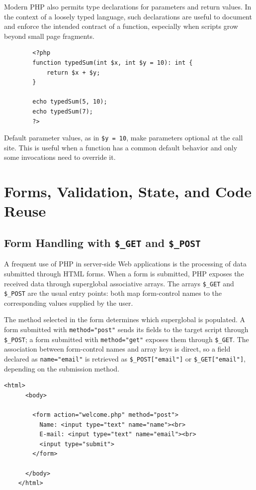 \documentclass{scrbook}
\begin{document}
	Modern PHP also permits type declarations for parameters and return values. In the context of a loosely typed language, such declarations are useful to document and enforce the intended contract of a function, especially when scripts grow beyond small page fragments.
	
	\begin{lstlisting}
		<?php
		function typedSum(int $x, int $y = 10): int {
			return $x + $y;
		}
		
		echo typedSum(5, 10);
		echo typedSum(7);
		?>
	\end{lstlisting}
	
	Default parameter values, as in \texttt{\$y = 10}, make parameters optional at the call site. This is useful when a function has a common default behavior and only some invocations need to override it.
	
	\chapter{Forms, Validation, State, and Code Reuse}
	
	\section{Form Handling with \texttt{\$\_GET} and \texttt{\$\_POST}}
	
	A frequent use of PHP in server-side Web applications is the processing of data submitted through HTML forms. When a form is submitted, PHP exposes the received data through superglobal associative arrays. The arrays \texttt{\$\_GET} and \texttt{\$\_POST} are the usual entry points: both map form-control names to the corresponding values supplied by the user.
	
	The method selected in the form determines which superglobal is populated. A form submitted with \texttt{method="post"} sends its fields to the target script through \texttt{\$\_POST}; a form submitted with \texttt{method="get"} exposes them through \texttt{\$\_GET}. The association between form-control names and array keys is direct, so a field declared as \texttt{name="email"} is retrieved as \texttt{\$\_POST["email"]} or \texttt{\$\_GET["email"]}, depending on the submission method.
	
	\begin{lstlisting}[caption={form-example.php}]
	<html>
	  <body>
		
		<form action="welcome.php" method="post">
		  Name: <input type="text" name="name"><br>
		  E-mail: <input type="text" name="email"><br>
		  <input type="submit">
		</form>
		
	  </body>
	</html>
	\end{lstlisting}
	
\end{document}
